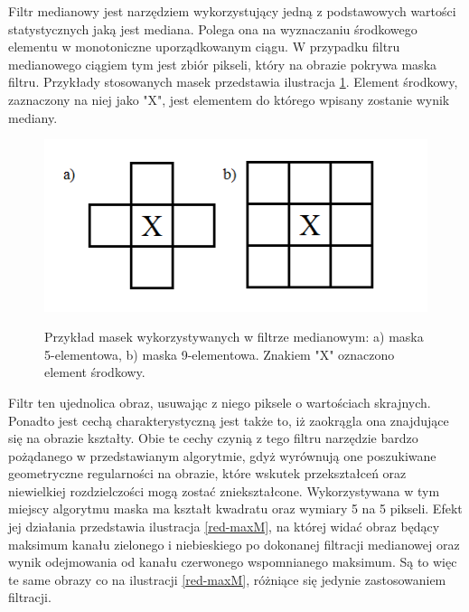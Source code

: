 Filtr medianowy jest narzędziem wykorzystujący jedną z podstawowych wartości statystycznych jaką jest mediana. Polega ona na wyznaczaniu środkowego elementu w monotoniczne uporządkowanym ciągu\cite{Malina}. W przypadku filtru medianowego ciągiem tym jest zbiór pikseli, który na obrazie pokrywa maska filtru. Przykłady stosowanych masek przedstawia ilustracja \ref{maski}. Element środkowy, zaznaczony na niej jako "X", jest elementem do którego wpisany zostanie wynik mediany.\newpage
\begin{figure}[H]
\begin{center}
\includegraphics[scale=0.8]{imgs/maski.png}
\caption[Przykład masek filtru medianowego.]\small{Przykład masek wykorzystywanych w filtrze medianowym: a) maska 5-elementowa, b) maska 9-elementowa. Znakiem "X" oznaczono element środkowy.}
\label{maski}
\end{center}
\end{figure}
Filtr ten ujednolica obraz, usuwając z niego piksele o wartościach skrajnych. Ponadto jest cechą charakterystyczną jest także to, iż zaokrągla ona znajdujące się na obrazie kształty. Obie te cechy czynią z tego filtru narzędzie bardzo pożądanego w przedstawianym algorytmie, gdyż wyrównują one poszukiwane geometryczne regularności na obrazie, które wskutek przekształceń oraz niewielkiej rozdzielczości mogą zostać zniekształcone. Wykorzystywana w tym miejscy algorytmu maska ma kształt kwadratu oraz wymiary 5 na 5 pikseli. Efekt jej działania przedstawia ilustracja \ref{red-maxM}, na której widać obraz będący maksimum kanału zielonego i niebieskiego po dokonanej filtracji medianowej oraz wynik odejmowania od kanału czerwonego wspomnianego maksimum. Są to więc te same obrazy co na ilustracji \ref{red-maxM}, różniące się jedynie zastosowaniem filtracji.
